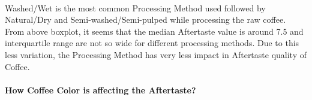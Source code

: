 \documentclass[11pt]{article}
\begin{document}
    \begin{center}
    \end{center}
    { \hspace*{\fill} \\}
    
    Washed/Wet is the most common Processing Method used followed by
Natural/Dry and Semi-washed/Semi-pulped while processing the raw coffee.
From above boxplot, it seems that the median Aftertaste value is around
7.5 and interquartile range are not so wide for different processing
methods. Due to this less variation, the Processing Method has very less
impact in Aftertaste quality of Coffee.

    \hypertarget{how-coffee-color-is-affecting-the-aftertaste}{%
\paragraph{How Coffee Color is affecting the
Aftertaste?}\label{how-coffee-color-is-affecting-the-aftertaste}}
\end{document}
